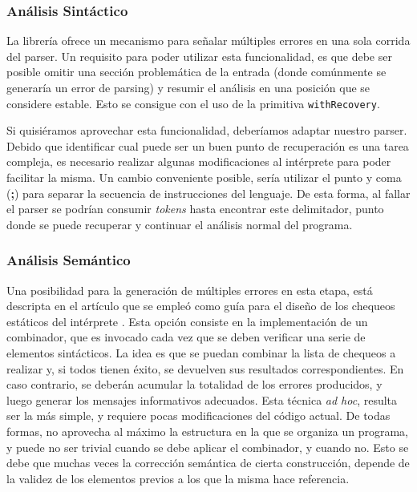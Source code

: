 \subsubsection{Análisis Sintáctico}

La librería \Megaparsec{} ofrece un mecanismo para señalar múltiples errores en una sola corrida del parser.
Un requisito para poder utilizar esta funcionalidad, es que debe ser posible omitir una sección problemática de la entrada (donde comúnmente se generaría un error de parsing) y resumir el análisis en una posición que se considere estable.
Esto se consigue con el uso de la primitiva \lstinline[style = haskell]{withRecovery}.

Si quisiéramos aprovechar esta funcionalidad, deberíamos adaptar nuestro parser.
Debido que identificar cual puede ser un buen punto de recuperación es una tarea compleja, es necesario realizar algunas modificaciones al intérprete para poder facilitar la misma.
Un cambio conveniente posible, sería utilizar el punto y coma (\textbf{;}) para separar la secuencia de instrucciones del lenguaje.
De esta forma, al fallar el parser se podrían consumir \textit{tokens} hasta encontrar este delimitador, punto donde se puede recuperar y continuar el análisis normal del programa.

\subsubsection{Análisis Semántico}

Una posibilidad para la generación de múltiples errores en esta etapa, está descripta en el artículo que se empleó como guía para el diseño de los chequeos estáticos del intérprete \cite{MonadicTC}.
Esta opción consiste en la implementación de un combinador, que es invocado cada vez que se deben verificar una serie de elementos sintácticos.
La idea es que se puedan combinar la lista de chequeos a realizar y, si todos tienen éxito, se devuelven sus resultados correspondientes.
En caso contrario, se deberán acumular la totalidad de los errores producidos, y luego generar los mensajes informativos adecuados.
Esta técnica \textit{ad hoc}, resulta ser la más simple, y requiere pocas modificaciones del código actual.
De todas formas, no aprovecha al máximo la estructura en la que se organiza un programa, y puede no ser trivial cuando se debe aplicar el combinador, y cuando no.
Esto se debe que muchas veces la corrección semántica de cierta construcción, depende de la validez de los elementos previos a los que la misma hace referencia.

